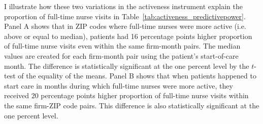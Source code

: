 \documentclass[final,12pt]{article}
\begin{document}
I illustrate how these two variations in the activeness instrument explain the proportion of full-time nurse visits in Table~\ref{tab:activeness_predictivepower}.
Panel A shows that in ZIP codes where full-time nurses were more active (i.e. above or equal to median), patients had 16 percentage points higher proportion of full-time nurse visits even within the same firm-month pairs.
The median values are created for each firm-month pair using the patient's start-of-care month.
The difference is statistically significant at the one percent level by the $t$-test of the equality of the means.
Panel B shows that when patients happened to start care in months during which full-time nurses were more active, they received 20 percentage points higher proportion of full-time nurse visits within the same firm-ZIP code pairs. This difference is also statistically significant at the one percent level.



\end{document}
